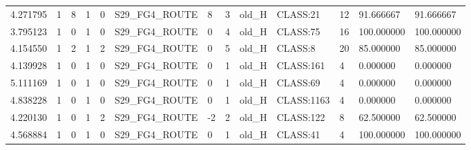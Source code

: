 \begin{tabular}{lllllllllllll}
4.271795 & 1 & 8 & 1 & 0 & S29\_FG4\_ROUTE & 8 & 3 & old\_H & CLASS:21 & 12 & 91.666667 & 91.666667 \\
3.795123 & 1 & 0 & 1 & 0 & S29\_FG4\_ROUTE & 0 & 4 & old\_H & CLASS:75 & 16 & 100.000000 & 100.000000 \\
4.154550 & 1 & 2 & 1 & 2 & S29\_FG4\_ROUTE & 0 & 5 & old\_H & CLASS:8 & 20 & 85.000000 & 85.000000 \\
4.139928 & 1 & 0 & 1 & 0 & S29\_FG4\_ROUTE & 0 & 1 & old\_H & CLASS:161 & 4 & 0.000000 & 0.000000 \\
5.111169 & 1 & 0 & 1 & 0 & S29\_FG4\_ROUTE & 0 & 1 & old\_H & CLASS:69 & 4 & 0.000000 & 0.000000 \\
4.838228 & 1 & 0 & 1 & 0 & S29\_FG4\_ROUTE & 0 & 1 & old\_H & CLASS:1163 & 4 & 0.000000 & 0.000000 \\
4.220130 & 1 & 0 & 1 & 2 & S29\_FG4\_ROUTE & -2 & 2 & old\_H & CLASS:122 & 8 & 62.500000 & 62.500000 \\
4.568884 & 1 & 0 & 1 & 0 & S29\_FG4\_ROUTE & 0 & 1 & old\_H & CLASS:41 & 4 & 100.000000 & 100.000000 \\
\bottomrule
\end{tabular}
